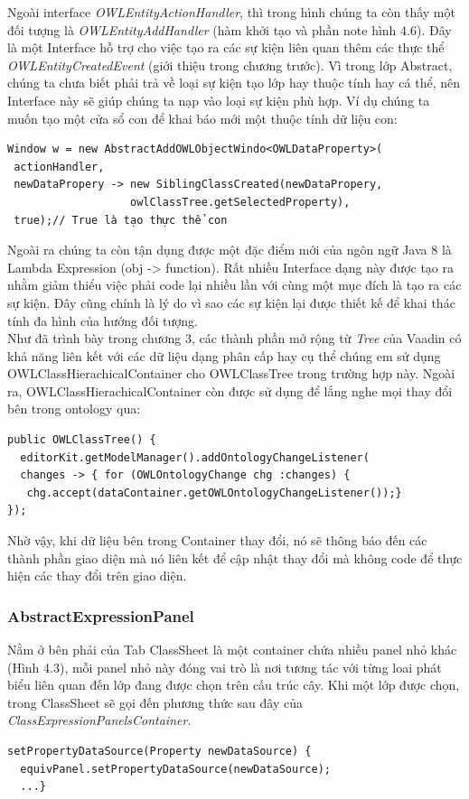 Ngoài interface \textit{OWLEntityActionHandler}, thì trong hình chúng ta còn thấy một đối tượng là \textit{OWLEntityAddHandler} (hàm khởi tạo và phần note hình 4.6). Đây là một Interface hỗ trợ cho việc tạo ra các sự kiện liên quan thêm các thực thể \textit{OWLEntityCreatedEvent} (giới thiệu trong chương trước). Vì trong lớp Abstract, chúng ta chưa biết phải trả về loại sự kiện tạo lớp hay thuộc tính hay cá thể, nên Interface này sẽ giúp chúng ta nạp vào loại sự kiện phù hợp. Ví dụ chúng ta muốn tạo một cửa sổ con để khai báo mới một thuộc tính dữ liệu con:
\begin{verbatim}
Window w = new AbstractAddOWLObjectWindo<OWLDataProperty>(
 actionHandler,
 newDataPropery -> new SiblingClassCreated(newDataPropery, 
                   owlClassTree.getSelectedProperty),
 true);// True là tạo thực thể con
\end{verbatim}
Ngoài ra chúng ta còn tận dụng được một đặc điểm mới của ngôn ngữ Java 8 là Lambda Expression (obj -> function). Rất nhiều Interface dạng này được tạo ra nhằm giảm thiểu việc phải code lại nhiều lần với cùng một mục đích là tạo ra các sự kiện. Đây cũng chính là lý do vì sao các sự kiện lại được thiết kế để khai thác tính đa hình của hướng đối tượng.
\\
Như đã trình bày trong chương 3, các thành phần mở rộng từ \textit{Tree} của Vaadin có khả năng liên kết với các dữ liệu dạng phân cấp hay cụ thể chúng em sử dụng OWLClassHierachicalContainer cho OWLClassTree trong trường hợp này. Ngoài ra, OWLClassHierachicalContainer còn được sử dụng để lắng nghe mọi thay đổi bên trong ontology qua:
\begin{verbatim}
public OWLClassTree() {
  editorKit.getModelManager().addOntologyChangeListener(
  changes -> { for (OWLOntologyChange chg :changes) { 
   chg.accept(dataContainer.getOWLOntologyChangeListener());}
});       
\end{verbatim}
Nhờ vậy, khi dữ liệu bên trong Container thay đổi, nó sẽ thông báo đến các thành phần giao diện mà nó liên kết để cập nhật thay đổi mà không code để thực hiện các thay đổi trên giao diện.
\subsubsection{AbstractExpressionPanel}
Nằm ở bên phải của Tab ClassSheet là một container chứa nhiều panel nhỏ khác (Hình 4.3), mỗi panel nhỏ này đóng vai trò là nơi tương tác với từng loai phát biểu liên quan đến lớp đang được chọn trên cấu trúc cây. Khi một lớp được chọn, trong ClassSheet sẽ gọi đến phương thức sau đây của \textit{ClassExpressionPanelsContainer}.
\begin{verbatim}
setPropertyDataSource(Property newDataSource) {
  equivPanel.setPropertyDataSource(newDataSource);
  ...}
\end{verbatim}

